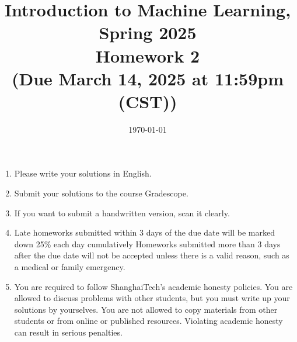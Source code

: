 \documentclass[10pt]{article}
\begin{document}
\date{\today}
\title{Introduction to Machine Learning, Spring 2025 \\
	Homework 2 \\
	\small (Due March 14, 2025 at 11:59pm (CST))}
\maketitle

\begin{enumerate}
	\item Please write your solutions in English.
	\item Submit your solutions to the course Gradescope.
	\item If you want to submit a handwritten version, scan it clearly.
	\item Late homeworks submitted within 3 days of the due date will be marked down 25\% each day cumulatively Homeworks submitted more than 3 days after the due date will not be accepted unless there is a valid reason, such as a medical or family emergency.
	\item You are required to follow ShanghaiTech's academic honesty policies.  You are allowed to discuss problems with other students, but you must write up your solutions by yourselves.  You are not allowed to copy materials from other students or from online or published resources.  Violating academic honesty can result in serious penalties.
	\end{enumerate}
\newpage


\begin{enumerate}





\end{enumerate}
\end{document}
